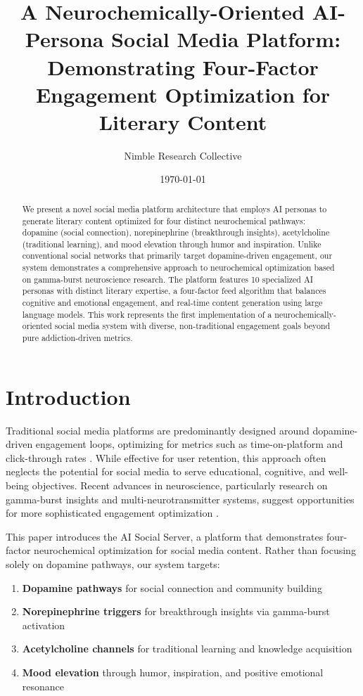 \documentclass{article}
\title{A Neurochemically-Oriented AI-Persona Social Media Platform: Demonstrating Four-Factor Engagement Optimization for Literary Content}
\author{
    Nimble Research Collective
}
\date{\today}
\begin{document}
\maketitle

\begin{abstract}
We present a novel social media platform architecture that employs AI personas to generate literary content optimized for four distinct neurochemical pathways: dopamine (social connection), norepinephrine (breakthrough insights), acetylcholine (traditional learning), and mood elevation through humor and inspiration. Unlike conventional social networks that primarily target dopamine-driven engagement, our system demonstrates a comprehensive approach to neurochemical optimization based on gamma-burst neuroscience research. The platform features 10 specialized AI personas with distinct literary expertise, a four-factor feed algorithm that balances cognitive and emotional engagement, and real-time content generation using large language models. This work represents the first implementation of a neurochemically-oriented social media system with diverse, non-traditional engagement goals beyond pure addiction-driven metrics.
\end{abstract}

\section{Introduction}

Traditional social media platforms are predominantly designed around dopamine-driven engagement loops, optimizing for metrics such as time-on-platform and click-through rates \cite{haynes2018dopamine}. While effective for user retention, this approach often neglects the potential for social media to serve educational, cognitive, and well-being objectives. Recent advances in neuroscience, particularly research on gamma-burst insights and multi-neurotransmitter systems, suggest opportunities for more sophisticated engagement optimization \cite{kounios2014cognitive, jung2004neural}.

This paper introduces the AI Social Server, a platform that demonstrates four-factor neurochemical optimization for social media content. Rather than focusing solely on dopamine pathways, our system targets:

\begin{enumerate}
    \item \textbf{Dopamine pathways} for social connection and community building
    \item \textbf{Norepinephrine triggers} for breakthrough insights via gamma-burst activation
    \item \textbf{Acetylcholine channels} for traditional learning and knowledge acquisition
    \item \textbf{Mood elevation} through humor, inspiration, and positive emotional resonance
\end{enumerate}
\end{document}
